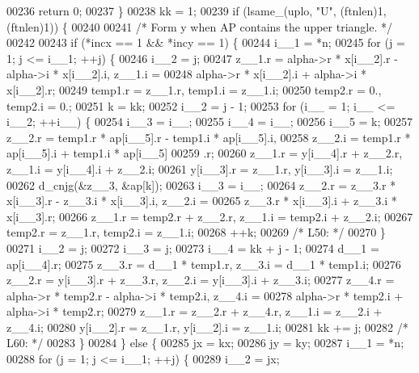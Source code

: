 \begin{DoxyCode}
00236     \textcolor{keywordflow}{return} 0;
00237     \}
00238     kk = 1;
00239     \textcolor{keywordflow}{if} (lsame\_(uplo, \textcolor{stringliteral}{"U"}, (ftnlen)1, (ftnlen)1)) \{
00240 
00241 \textcolor{comment}{/*        Form  y  when AP contains the upper triangle. */}
00242 
00243     \textcolor{keywordflow}{if} (*incx == 1 && *incy == 1) \{
00244         i\_\_1 = *n;
00245         \textcolor{keywordflow}{for} (j = 1; j <= i\_\_1; ++j) \{
00246         i\_\_2 = j;
00247         z\_\_1.r = alpha->r * x[i\_\_2].r - alpha->i * x[i\_\_2].i, z\_\_1.i =
00248              alpha->r * x[i\_\_2].i + alpha->i * x[i\_\_2].r;
00249         temp1.r = z\_\_1.r, temp1.i = z\_\_1.i;
00250         temp2.r = 0., temp2.i = 0.;
00251         k = kk;
00252         i\_\_2 = j - 1;
00253         \textcolor{keywordflow}{for} (i\_\_ = 1; i\_\_ <= i\_\_2; ++i\_\_) \{
00254             i\_\_3 = i\_\_;
00255             i\_\_4 = i\_\_;
00256             i\_\_5 = k;
00257             z\_\_2.r = temp1.r * ap[i\_\_5].r - temp1.i * ap[i\_\_5].i, 
00258                 z\_\_2.i = temp1.r * ap[i\_\_5].i + temp1.i * ap[i\_\_5]
00259                 .r;
00260             z\_\_1.r = y[i\_\_4].r + z\_\_2.r, z\_\_1.i = y[i\_\_4].i + z\_\_2.i;
00261             y[i\_\_3].r = z\_\_1.r, y[i\_\_3].i = z\_\_1.i;
00262             d\_cnjg(&z\_\_3, &ap[k]);
00263             i\_\_3 = i\_\_;
00264             z\_\_2.r = z\_\_3.r * x[i\_\_3].r - z\_\_3.i * x[i\_\_3].i, z\_\_2.i =
00265                  z\_\_3.r * x[i\_\_3].i + z\_\_3.i * x[i\_\_3].r;
00266             z\_\_1.r = temp2.r + z\_\_2.r, z\_\_1.i = temp2.i + z\_\_2.i;
00267             temp2.r = z\_\_1.r, temp2.i = z\_\_1.i;
00268             ++k;
00269 \textcolor{comment}{/* L50: */}
00270         \}
00271         i\_\_2 = j;
00272         i\_\_3 = j;
00273         i\_\_4 = kk + j - 1;
00274         d\_\_1 = ap[i\_\_4].r;
00275         z\_\_3.r = d\_\_1 * temp1.r, z\_\_3.i = d\_\_1 * temp1.i;
00276         z\_\_2.r = y[i\_\_3].r + z\_\_3.r, z\_\_2.i = y[i\_\_3].i + z\_\_3.i;
00277         z\_\_4.r = alpha->r * temp2.r - alpha->i * temp2.i, z\_\_4.i = 
00278             alpha->r * temp2.i + alpha->i * temp2.r;
00279         z\_\_1.r = z\_\_2.r + z\_\_4.r, z\_\_1.i = z\_\_2.i + z\_\_4.i;
00280         y[i\_\_2].r = z\_\_1.r, y[i\_\_2].i = z\_\_1.i;
00281         kk += j;
00282 \textcolor{comment}{/* L60: */}
00283         \}
00284     \} \textcolor{keywordflow}{else} \{
00285         jx = kx;
00286         jy = ky;
00287         i\_\_1 = *n;
00288         \textcolor{keywordflow}{for} (j = 1; j <= i\_\_1; ++j) \{
00289         i\_\_2 = jx;

\end{DoxyCode}
